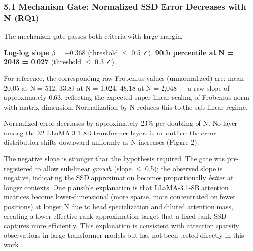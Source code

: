 
\subsubsection{5.1 Mechanism Gate: Normalized SSD Error Decreases with N (RQ1)}

The mechanism gate passes both criteria with large margin.

\begin{table}[htbp]
\centering
{}
\end{table}

\textbf{Log-log slope $\beta = -0.368$} (threshold $\leq$ 0.5 ✓). \textbf{90th percentile at N = 2048 = 0.027} (threshold $\leq$ 0.3 ✓).

For reference, the corresponding raw Frobenius values (unnormalized) are: mean 20.05 at N = 512, 33.89 at N = 1,024, 48.18 at N = 2,048 --- a raw slope of approximately 0.63, reflecting the expected super-linear scaling of Frobenius norm with matrix dimension. Normalization by N reduces this to the sub-linear regime.

Normalized error decreases by approximately 23\% per doubling of N. No layer among the 32 LLaMA-3.1-8B transformer layers is an outlier: the error distribution shifts downward uniformly as N increases (Figure 2).

The negative slope is stronger than the hypothesis required. The gate was pre-registered to allow sub-linear \textit{growth} (slope $\leq$ 0.5); the observed slope is negative, indicating the SSD approximation becomes proportionally \textit{better} at longer contexts. One plausible explanation is that LLaMA-3.1-8B attention matrices become lower-dimensional (more sparse, more concentrated on fewer positions) at longer N due to head specialization and diluted attention mass, creating a lower-effective-rank approximation target that a fixed-rank SSD captures more efficiently. This explanation is consistent with attention sparsity observations in large transformer models but has not been tested directly in this work.

